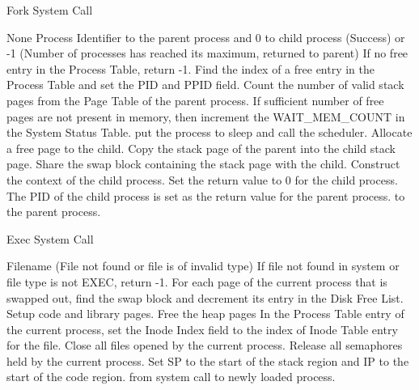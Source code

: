 

\begin{algorithm}
\caption{Fork System Call}
\begin{algorithmic}
\REQUIRE None
\ENSURE Process Identifier to the parent process and 0 to child process (Success) or -1 (Number of processes has reached its maximum, returned to parent)
\STATE If no free entry in the Process Table, return -1.  
\STATE Find the index of a free entry in the Process Table and set the PID and PPID field.   
\STATE Count the number of valid stack pages from the Page Table of the parent process.   
\STATE If sufficient number of free pages are not present in memory, then increment the WAIT\_MEM\_COUNT in the System Status Table.
    \STATE put the process to sleep and call the scheduler.
\ENDWHILE
{}
        \STATE Allocate a free page to the child.
        \STATE Copy the stack page of the parent into the child stack page.
        \ELSE 
            \STATE Share the swap block containing the stack page with the child.
    \ENDIF
\ENDFOR
\STATE Construct the context of the child process.
\STATE Set the return value to 0 for the child process.
\STATE The PID of the child process is set as the return value for the parent process.
\RETURN to the parent process.

\end{algorithmic}
\end{algorithm}


\begin{algorithm}
\caption{Exec System Call}
\begin{algorithmic}
\REQUIRE Filename
 (File not found or file is of invalid type)
\STATE If file not found in system or file type is not EXEC, return -1. \STATE For each page of the current process that is swapped out, find the swap block and decrement its entry in the Disk Free List. 
\STATE Setup code and library pages.
\STATE Free the heap pages
\STATE In the Process Table entry of the current process, set the Inode Index field to the index of Inode Table entry for the file.
\STATE Close all files opened by the current process.     
\STATE Release all semaphores held by the current process.   
\STATE Set SP to the start of the stack region and IP to the start of the code region. 
\RETURN from system call to newly loaded process.
\end{algorithmic}
\end{algorithm}

